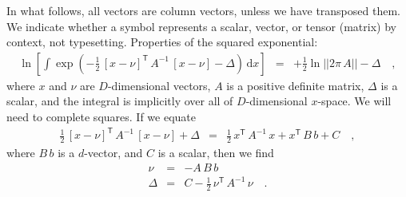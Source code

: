 \documentclass[manuscript, letterpaper]{aastex6}
\newcommand{\dd}{\mathrm{d}}
\newcommand{\transp}[1]{{#1}^{\!\mathsf{T}}}
\newcommand{\inv}[1]{{#1}^{-1}}
\begin{document}
In what follows, all vectors are column vectors, unless we have transposed them.
We indicate whether a symbol represents a scalar, vector, or tensor
(matrix) by context, not typesetting.
Properties of the squared exponential:
\begin{eqnarray}
  \ln\left[\int\exp(-\frac{1}{2}\,\transp{[x-\nu]}\,\inv{A}\,[x-\nu] - \Delta)\,\dd x\right]
  &=& +\frac{1}{2}\ln ||2\pi\,A|| -\Delta
  \quad ,
\end{eqnarray}
where $x$ and $\nu$ are $D$-dimensional vectors, $A$ is a positive definite
matrix, $\Delta$ is a scalar, and the integral is implicitly over all
of $D$-dimensional $x$-space.
We will need to complete squares.
If we equate
\begin{eqnarray}
  \frac{1}{2}\,\transp{[x-\nu]}\,\inv{A}\,[x-\nu] + \Delta
  &=& \frac{1}{2}\,\transp{x}\,\inv{A}\,x + \transp{x}\,B\,b + C
  \quad ,
\end{eqnarray}
where $B\,b$ is a $d$-vector, and $C$ is a scalar, then we find
\begin{eqnarray}
  \nu &=& -A\,B\,b
  \\
  \Delta & = & C - \frac{1}{2}\,\transp{\nu}\,\inv{A}\,\nu
  \quad .
\end{eqnarray}
\end{document}
